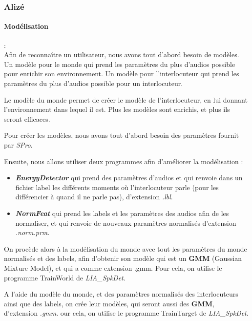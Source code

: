 \subsubsection{Alizé}
\label{sec:alizeImpl}


\paragraph*{Modélisation} : \\

Afin de reconnaître un utilisateur, nous avons tout d'abord besoin de modèles.
Un modèle pour le monde qui prend les paramètres du plus d'audios possible pour enrichir son environnement.
Un modèle pour l'interlocuteur qui prend les paramètres du plus d'audios possible pour un interlocuteur.

Le modèle du monde permet de créer le modèle de l'interlocuteur, en lui donnant l'environnement dans lequel il est.
Plus les modèles sont enrichis, et plus ils seront efficaces.

Pour créer les modèles, nous avons tout d'abord besoin des paramètres fournit par \textit{SPro}.

Ensuite, nous allons utiliser deux programmes afin d'améliorer la modélisation :
\begin{itemize}
      \item  \textit{\textbf{EnergyDetector}} qui prend des paramètres d'audios et qui renvoie dans un fichier label les différents moments où
            l'interlocuteur parle (pour les différencier à quand il ne parle pas), d'extension \textit{.lbl}.
      \item\textit{\textbf{ NormFeat }} qui prend les labels et les paramètres des audios afin de les normaliser, et qui renvoie de
            nouveaux paramètres normalisés d'extension \textit{.norm.prm}.
\end{itemize}


On procède alors à la modélisation du monde avec tout les paramètres du monde normalisés et des labels, afin d'obtenir son modèle qui est un \textbf{GMM}
(Gaussian Mixture Model), et qui a comme extension .gmm.
Pour cela, on utilise le programme TrainWorld de \textit{  LIA\_SpkDet}.

A l'aide du modèle du monde, et des paramètres normalisés des interlocuteurs ainsi que des labels, on crée leur modèles, qui seront aussi des \textbf{GMM},
d'extension \textit{.gmm}.
our cela, on utilise le programme TrainTarget de \textit{ LIA\_SpkDet}.


